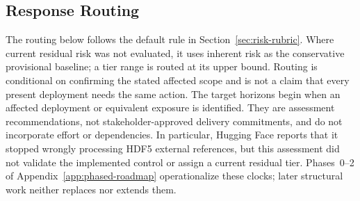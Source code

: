 \documentclass[../main.tex]{subfiles}
\begin{document}
\subsection{Response Routing}

The routing below follows the default rule in
Section~\ref{sec:risk-rubric}. Where current residual risk was not evaluated,
it uses inherent risk as the conservative provisional baseline; a tier range is
routed at its upper bound. Routing is conditional on confirming the stated
affected scope and is not a claim that every present deployment needs the same
action. The target horizons begin when an affected deployment or equivalent
exposure is identified. They are assessment recommendations, not
stakeholder-approved delivery commitments, and do not incorporate effort or
dependencies. In particular, Hugging Face reports that it stopped wrongly
processing HDF5 external references, but this assessment did not validate the
implemented control or assign a current residual tier.
Phases~0--2 of Appendix~\ref{app:phased-roadmap} operationalize these clocks;
later structural work neither replaces nor extends them.

\begingroup
\small
\setlength{\tabcolsep}{3pt}
\renewcommand{\arraystretch}{1.15}

\setlength{\LTleft}{-0.9in}
\setlength{\LTright}{-0.9in}
\end{document}
